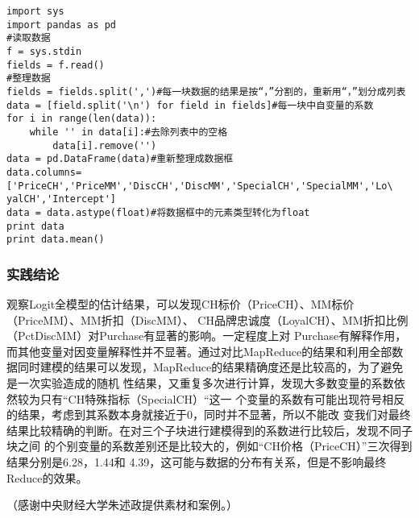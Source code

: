 \begin{lstlisting}
import sys
import pandas as pd
#读取数据
f = sys.stdin
fields = f.read()
#整理数据
fields = fields.split(',')#每一块数据的结果是按“，”分割的，重新用“，”划分成列表
data = [field.split('\n') for field in fields]#每一块中自变量的系数
for i in range(len(data)):
    while '' in data[i]:#去除列表中的空格
        data[i].remove('')
data = pd.DataFrame(data)#重新整理成数据框
data.columns=['PriceCH','PriceMM','DiscCH','DiscMM','SpecialCH','SpecialMM','Lo\
yalCH','Intercept']
data = data.astype(float)#将数据框中的元素类型转化为float
print data
print data.mean()
\end{lstlisting}

\subsubsection{实践结论}\label{ux5b9eux8df5ux7ed3ux8bba}

观察Logit全模型的估计结果，可以发现CH标价（PriceCH）、MM标价（PriceMM）、MM折扣（DiscMM）、
CH品牌忠诚度（LoyalCH）、MM折扣比例（PctDiscMM）对Purchase有显著的影响。一定程度上对
Purchase有解释作用，而其他变量对因变量解释性并不显著。通过对比MapReduce的结果和利用全部数
据同时建模的结果可以发现，MapReduce的结果精确度还是比较高的，为了避免是一次实验造成的随机
性结果，又重复多次进行计算，发现大多数变量的系数依然较为只有``CH特殊指标（SpecialCH）``这一
个变量的系数有可能出现符号相反的结果，考虑到其系数本身就接近于0，同时并不显著，所以不能改
变我们对最终结果比较精确的判断。在对三个子块进行建模得到的系数进行比较后，发现不同子块之间
的个别变量的系数差别还是比较大的，例如``CH价格（PriceCH）''三次得到结果分别是6.28，1.44和
4.39，这可能与数据的分布有关系，但是不影响最终Reduce的效果。

（感谢中央财经大学朱述政提供素材和案例。）
